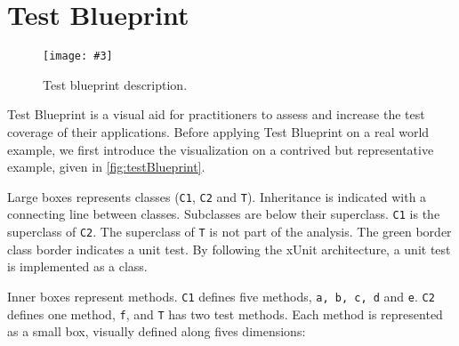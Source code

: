 \documentclass{sig-alternate}
\newcommand{\ct}{\lstinline[backgroundcolor=\color{white},basicstyle=\footnotesize\ttfamily]}
\newcommand{\fig}[4]{
	\begin{figure}[#1]
		\centering
		\texttt{[image: \#3]}
		\caption{\label{fig:#3}#4}
	\end{figure}}
\newcommand{\seclabel}[1]{\label{sec:#1}}
\begin{document}

\section{Test Blueprint}\seclabel{testblueprint}


\fig{}{0.5}{testBlueprint}{Test blueprint description.}

Test Blueprint is a visual aid for practitioners to assess and increase the test coverage of their applications. 
Before applying Test Blueprint on a real world example, we first introduce the visualization on a contrived but representative example, given in \autoref{fig:testBlueprint}.

Large boxes represents classes (\ct{C1}, \ct{C2} and \ct{T}). Inheritance is indicated with a connecting line between classes. Subclasses are below their superclass. \ct{C1} is the superclass of \ct{C2}. The superclass of \ct{T} is not part of the analysis. The green border class border indicates a unit test. By following the xUnit architecture, a unit test is implemented as a class.

Inner boxes represent methods. \ct{C1} defines five methods, \ct{a, b, c, d} and \ct{e}. \ct{C2} defines one method, \ct{f}, and \ct{T} has two test methods. Each method is represented as a small box, visually defined along fives dimensions:
\end{document}
